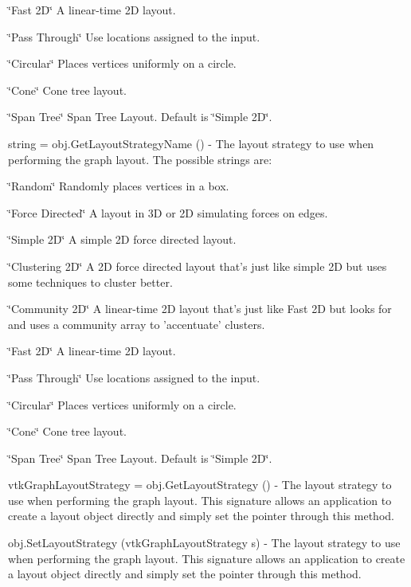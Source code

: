 \begin{DoxyItemize}
\begin{DoxyItemize}
\item \char`\"{}\-Fast 2\-D\char`\"{} A linear-\/time 2\-D layout.
\item \char`\"{}\-Pass Through\char`\"{} Use locations assigned to the input.
\item \char`\"{}\-Circular\char`\"{} Places vertices uniformly on a circle.
\item \char`\"{}\-Cone\char`\"{} Cone tree layout.
\item \char`\"{}\-Span Tree\char`\"{} Span Tree Layout. Default is \char`\"{}\-Simple 2\-D\char`\"{}.  
\end{DoxyItemize}
\item {\ttfamily string = obj.\-Get\-Layout\-Strategy\-Name ()} -\/ The layout strategy to use when performing the graph layout. The possible strings are\-:
\begin{DoxyItemize}
\item \char`\"{}\-Random\char`\"{} Randomly places vertices in a box.
\item \char`\"{}\-Force Directed\char`\"{} A layout in 3\-D or 2\-D simulating forces on edges.
\item \char`\"{}\-Simple 2\-D\char`\"{} A simple 2\-D force directed layout.
\item \char`\"{}\-Clustering 2\-D\char`\"{} A 2\-D force directed layout that's just like simple 2\-D but uses some techniques to cluster better.
\item \char`\"{}\-Community 2\-D\char`\"{} A linear-\/time 2\-D layout that's just like Fast 2\-D but looks for and uses a community array to 'accentuate' clusters.
\item \char`\"{}\-Fast 2\-D\char`\"{} A linear-\/time 2\-D layout.
\item \char`\"{}\-Pass Through\char`\"{} Use locations assigned to the input.
\item \char`\"{}\-Circular\char`\"{} Places vertices uniformly on a circle.
\item \char`\"{}\-Cone\char`\"{} Cone tree layout.
\item \char`\"{}\-Span Tree\char`\"{} Span Tree Layout. Default is \char`\"{}\-Simple 2\-D\char`\"{}.  
\end{DoxyItemize}
\item {\ttfamily vtk\-Graph\-Layout\-Strategy = obj.\-Get\-Layout\-Strategy ()} -\/ The layout strategy to use when performing the graph layout. This signature allows an application to create a layout object directly and simply set the pointer through this method.  
\item {\ttfamily obj.\-Set\-Layout\-Strategy (vtk\-Graph\-Layout\-Strategy s)} -\/ The layout strategy to use when performing the graph layout. This signature allows an application to create a layout object directly and simply set the pointer through this method.  

\end{DoxyItemize}
